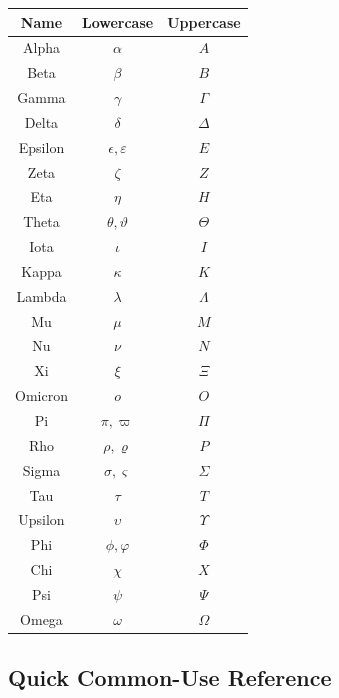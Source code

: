 \begin{center}
\begin{tabular}{c|c|c}
\textbf{Name}
&
\textbf{Lowercase}
&
\textbf{Uppercase}
\\ \hline

Alpha & \(\alpha\) & \(A\) \\
Beta & \(\beta\) & \(B\) \\
Gamma & \(\gamma\) & \(\Gamma\) \\
Delta & \(\delta\) & \(\Delta\) \\
Epsilon & \(\epsilon,\varepsilon\) & \(E\) \\
Zeta & \(\zeta\) & \(Z\) \\
Eta & \(\eta\) & \(H\) \\
Theta & \(\theta,\vartheta\) & \(\Theta\) \\
Iota & \(\iota\) & \(I\) \\
Kappa & \(\kappa\) & \(K\) \\
Lambda & \(\lambda\) & \(\Lambda\) \\
Mu & \(\mu\) & \(M\) \\
Nu & \(\nu\) & \(N\) \\
Xi & \(\xi\) & \(\Xi\) \\
Omicron & \(o\) & \(O\) \\
Pi & \(\pi,\varpi\) & \(\Pi\) \\
Rho & \(\rho,\varrho\) & \(P\) \\
Sigma & \(\sigma,\varsigma\) & \(\Sigma\) \\
Tau & \(\tau\) & \(T\) \\
Upsilon & \(\upsilon\) & \(\Upsilon\) \\
Phi & \(\phi,\varphi\) & \(\Phi\) \\
Chi & \(\chi\) & \(X\) \\
Psi & \(\psi\) & \(\Psi\) \\
Omega & \(\omega\) & \(\Omega\)
\end{tabular}
\end{center}

\subsection{Quick Common-Use Reference}
\label{subsec:quick-greek-use-reference}

